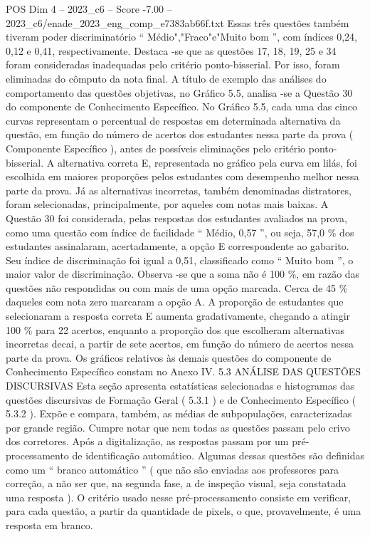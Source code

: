 \begin{textsample}{POS Dim 4 – 2023\_c6 – Score -7.00 – 2023\_c6/enade\_2023\_eng\_comp\_e7383ab66f.txt}
Essas três questões também tiveram poder discriminatório “ Médio","Fraco"e"Muito bom ”, com índices 0,24, 0,12 e 0,41, respectivamente.
Destaca -se que as questões 17, 18, 19, 25 e 34 foram consideradas inadequadas pelo critério ponto-bisserial.
Por isso, foram eliminadas do cômputo da nota final.
A título de exemplo das análises do comportamento das questões objetivas, no Gráfico 5.5, analisa -se a Questão 30 do componente de Conhecimento Específico.
No Gráfico 5.5, cada uma das cinco curvas representam o percentual de respostas em determinada alternativa da questão, em função do número de acertos dos estudantes nessa parte da prova ( Componente Específico ), antes de possíveis eliminações pelo critério ponto-bisserial.
A alternativa correta E, representada no gráfico pela curva em lilás, foi escolhida em maiores proporções pelos estudantes com desempenho melhor nessa parte da prova.
Já as alternativas incorretas, também denominadas distratores, foram selecionadas, principalmente, por aqueles com notas mais baixas.
A Questão 30 foi considerada, pelas respostas dos estudantes avaliados na prova, como uma questão com índice de facilidade “ Médio, 0,57 ”, ou seja, 57,0 \% dos estudantes assinalaram, acertadamente, a opção E correspondente ao gabarito.
Seu índice de discriminação foi igual a 0,51, classificado como “ Muito bom ”, o maior valor de discriminação.
Observa -se que a soma não é 100 \%, em razão das questões não respondidas ou com mais de uma opção marcada.
Cerca de 45 \% daqueles com nota zero marcaram a opção A.
A proporção de estudantes que selecionaram a resposta correta E aumenta gradativamente, chegando a atingir 100 \% para 22 acertos, enquanto a proporção dos que escolheram alternativas incorretas decai, a partir de sete acertos, em função do número de acertos nessa parte da prova.
Os gráficos relativos às demais questões do componente de Conhecimento Específico constam no Anexo IV. 5.3 ANÁLISE DAS QUESTÕES DISCURSIVAS Esta seção apresenta estatísticas selecionadas e histogramas das questões discursivas de Formação Geral ( 5.3.1 ) e de Conhecimento Específico ( 5.3.2 ).
Expõe e compara, também, as médias de subpopulações, caracterizadas por grande região.
Cumpre notar que nem todas as questões passam pelo crivo dos corretores.
Após a digitalização, as respostas passam por um pré-processamento de identificação automático.
Algumas dessas questões são definidas como um “ branco automático ” ( que não são enviadas aos professores para correção, a não ser que, na segunda fase, a de inspeção visual, seja constatada uma resposta ).
O critério usado nesse pré-processamento consiste em verificar, para cada questão, a partir da quantidade de pixels, o que, provavelmente, é uma resposta em branco.

\end{textsample}
